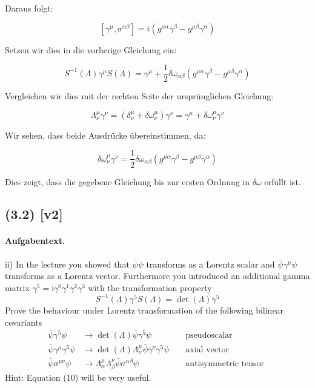 \documentclass[11pt,a4paper]{article}
\begin{document}
Daraus folgt:

\[
[\gamma^\mu, \sigma^{\alpha\beta}] = i (g^{\mu\alpha} \gamma^\beta - g^{\mu\beta} \gamma^\alpha)
\]

Setzen wir dies in die vorherige Gleichung ein:

\[
S^{-1}(\Lambda) \gamma^\mu S(\Lambda) = \gamma^\mu + \frac{1}{2} \delta \omega_{\alpha\beta} (g^{\mu\alpha} \gamma^\beta - g^{\mu\beta} \gamma^\alpha)
\]

Vergleichen wir dies mit der rechten Seite der ursprünglichen Gleichung:

\[
\Lambda_\nu^\mu \gamma^\nu = (\delta^\mu_\nu + \delta \omega^\mu_\nu) \gamma^\nu = \gamma^\mu + \delta \omega^\mu_\nu \gamma^\nu
\]

Wir sehen, dass beide Ausdrücke übereinstimmen, da:

\[
\delta \omega^\mu_\nu \gamma^\nu = \frac{1}{2} \delta \omega_{\alpha\beta} (g^{\mu\alpha} \gamma^\beta - g^{\mu\beta} \gamma^\alpha)
\]

Dies zeigt, dass die gegebene Gleichung bis zur ersten Ordnung in $\delta \omega$ erfüllt ist.


\subsection*{(3.2) [v2]}
\paragraph{Aufgabentext.}
ii) In the lecture you showed that $\bar{\psi} \psi$ transforms as a Lorentz scalar and $\bar{\psi} \gamma^\mu \psi$ transforms as a Lorentz vector. Furthermore you introduced an additional gamma matrix $\gamma^5=\mathrm{i} \gamma^0 \gamma^1 \gamma^2 \gamma^3$ with the transformation property
$$
S^{-1}(\Lambda) \gamma^5 S(\Lambda)=\operatorname{det}(\Lambda) \gamma^5
$$
Prove the behaviour under Lorentz transformation of the following bilinear covariants
$$
\begin{aligned}
\bar{\psi} \gamma^5 \psi & \rightarrow \operatorname{det}(\Lambda) \bar{\psi} \gamma^5 \psi & & \text { pseudoscalar } \\
\bar{\psi} \gamma^\mu \gamma^5 \psi & \rightarrow \operatorname{det}(\Lambda) \Lambda_\nu^\mu \bar{\psi} \gamma^\nu \gamma^5 \psi & & \text { axial vector } \\
\bar{\psi} \sigma^{\mu \nu} \psi & \rightarrow \Lambda_\alpha^\mu \Lambda_\beta^\nu \bar{\psi} \sigma^{\alpha \beta} \psi & & \text { antisymmetric tensor }
\end{aligned}
$$
Hint: Equation (10) will be very useful.
\end{document}
